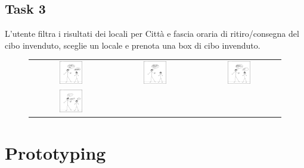 \documentclass{article}
\begin{document}
\subsection{Task 3}
L'utente filtra i risultati dei locali per Città e fascia oraria di ritiro/consegna del cibo invenduto, sceglie un locale e prenota una box di cibo invenduto.
\begin{figure}[H]
    \centering
    \begin{tabular}{ccc}
        \includegraphics[width=0.3\textwidth]{Storyboard/task3-img/t3.1.png} &
        \includegraphics[width=0.3\textwidth]{Storyboard/task3-img/t3.2.png} &
        \includegraphics[width=0.3\textwidth]{Storyboard/task3-img/t3.3.png} \\
        \includegraphics[width=0.3\textwidth]{Storyboard/task3-img/t3.4.png} & & \\
    \end{tabular}
    \label{fig:task2}
\end{figure}

\section{Prototyping}
\end{document}
